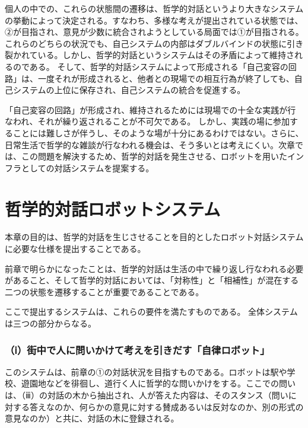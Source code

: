 \documentclass[b5j,twoside,twocolumn]{utarticle}
\begin{document}
個人の中での、これらの状態間の遷移は、哲学的対話というより大きなシステムの挙動によって決定される。すなわち、多様な考えが提出されている状態では、②が目指され、意見が少数に統合されようとしている局面では①が目指される。
これらのどちらの状況でも、自己システムの内部はダブルバインドの状態に引き裂かれている。しかし、哲学的対話というシステムはその矛盾によって維持されるのである。
そして、哲学的対話システムによって形成される「自己変容の回路」は、一度それが形成されると、他者との現場での相互行為が終了しても、自己システムの上位に保存され、自己システムの統合を促進する。


「自己変容の回路」が形成され、維持されるためには現場での十全な実践が行なわれ、それが繰り返されることが不可欠である。
しかし、実践の場に参加することには難しさが伴うし、そのような場が十分にあるわけではない。さらに、日常生活で哲学的な雑談が行なわれる機会は、そう多いとは考えにくい。次章では、この問題を解決するため、哲学的対話を発生させる、ロボットを用いたインフラとしての対話システムを提案する。

\section{哲学的対話ロボットシステム}
本章の目的は、哲学的対話を生じさせることを目的としたロボット対話システムに必要な仕様を提出することである。





前章で明らかになったことは、哲学的対話は生活の中で繰り返し行なわれる必要があること、そして哲学的対話においては、「対称性」と「相補性」が混在する二つの状態を遷移することが重要であることである。


ここで提出するシステムは、これらの要件を満たすものである。
全体システムは三つの部分からなる。
\subsubsection*{（ⅰ）街中で人に問いかけて考えを引きだす「自律ロボット」}
このシステムは、前章の①の対話状況を目指すものである。ロボットは駅や学校、遊園地などを徘徊し、道行く人に哲学的な問いかけをする。ここでの問いは、（ⅲ）の対話の木から抽出され、人が答えた内容は、そのスタンス（問いに対する答えなのか、何らかの意見に対する賛成あるいは反対なのか、別の形式の意見なのか）と共に、対話の木に登録される。
\end{document}
